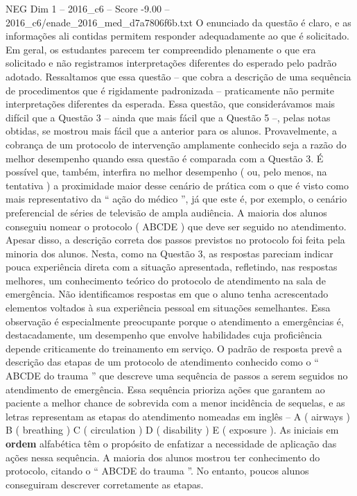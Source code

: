 \begin{textsample}{NEG Dim 1 – 2016\_c6 – Score -9.00 – 2016\_c6/enade\_2016\_med\_d7a7806f6b.txt}
O enunciado da questão é claro, e as informações ali contidas permitem responder adequadamente ao que é solicitado.
Em geral, os estudantes parecem ter compreendido plenamente o que era solicitado e não registramos interpretações diferentes do esperado pelo padrão adotado.
Ressaltamos que essa questão – que cobra a descrição de uma sequência de procedimentos que é rigidamente padronizada – praticamente não permite interpretações diferentes da esperada.
Essa questão, que considerávamos mais difícil que a Questão 3 – ainda que mais fácil que a Questão 5 –, pelas notas obtidas, se mostrou mais fácil que a anterior para os alunos.
Provavelmente, a cobrança de um protocolo de intervenção amplamente conhecido seja a razão do melhor desempenho quando essa questão é comparada com a Questão 3.
É possível que, também, interfira no melhor desempenho ( ou, pelo menos, na tentativa ) a proximidade maior desse cenário de prática com o que é visto como mais representativo da “ ação do médico ”, já que este é, por exemplo, o cenário preferencial de séries de televisão de ampla audiência.
A maioria dos alunos conseguiu nomear o protocolo ( ABCDE ) que deve ser seguido no atendimento.
Apesar disso, a descrição correta dos passos previstos no protocolo foi feita pela minoria dos alunos.
Nesta, como na Questão 3, as respostas pareciam indicar pouca experiência direta com a situação apresentada, refletindo, nas respostas melhores, um conhecimento teórico do protocolo de atendimento na sala de emergência.
Não identificamos respostas em que o aluno tenha acrescentado elementos voltados à sua experiência pessoal em situações semelhantes.
Essa observação é especialmente preocupante porque o atendimento a emergências é, destacadamente, um desempenho que envolve habilidades cuja proficiência depende criticamente do treinamento em serviço.
O padrão de resposta prevê a descrição das etapas de um protocolo de atendimento conhecido como o “ ABCDE do trauma ” que descreve uma sequência de passos a serem seguidos no atendimento de emergência.
Essa sequência prioriza ações que garantem ao paciente a melhor chance de sobrevida com a menor incidência de sequelas, e as letras representam as etapas do atendimento nomeadas em inglês – A ( airways ) B ( breathing ) C ( circulation ) D ( disability ) E ( exposure ).
As iniciais em \textbf{ordem} alfabética têm o propósito de enfatizar a necessidade de aplicação das ações nessa sequência.
A maioria dos alunos mostrou ter conhecimento do protocolo, citando o “ ABCDE do trauma ”.
No entanto, poucos alunos conseguiram descrever corretamente as etapas.

\end{textsample}
